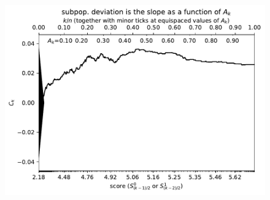 \documentclass{article}
\newlength{\vertsep}
\newlength{\imsize}
\begin{document}
\begin{figure}
\begin{centering}

\parbox{\imsize}{\includegraphics[width=\imsize]
{../codes/weighted/County_of_San_Francisco_vs_San_Mateo-LNGI/cumulative.pdf}}

\vspace{\vertsep}


\end{centering}
\end{figure}
\end{document}
